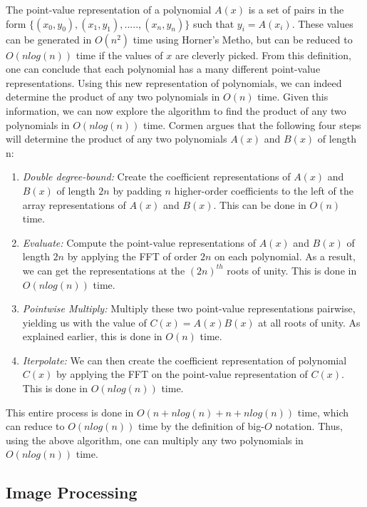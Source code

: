 \documentclass{amsproc}
\begin{document}
The point-value representation of a polynomial $A(x)$ is a set of pairs in the form ${\{(x_0, y_0), (x_1, y_1), ..... , (x_n, y_n)\}}$ such that $y_i = A(x_i)$.  These values can be generated in $O(n^2)$  time using Horner's Metho, but can be reduced to $O(nlog(n))$ time if the values of $x$ are cleverly picked. From this definition, one can conclude that each polynomial has a many different point-value representations. Using this new representation of polynomials, we can indeed determine the product of any two polynomials in $O(n)$ time. Given this information, we can now explore the algorithm to find the product of any two polynomials in $O(nlog(n))$ time. Cormen argues that the following four steps will determine the product of any two polynomials $A(x)$ and $B(x)$ of length n:

\begin{enumerate}
	\item \textit{Double degree-bound: } Create the coefficient representations of $A(x)$ and $B(x)$ of length $2n$ by padding $n$ higher-order coefficients to the left of the array representations of $A(x)$ and $B(x)$. This can be done in $O(n)$ time.
	\item \textit{Evaluate: } Compute the point-value representations of $A(x)$ and $B(x)$ of length $2n$ by applying the FFT of order $2n$ on each polynomial. As a result, we can get the representations at the $(2n)^{th}$ roots of unity. This is done in $O(nlog(n))$ time.
	\item \textit{Pointwise Multiply: } Multiply these two point-value representations pairwise, yielding us with the value of $C(x) = A(x)B(x)$ at all roots of unity. As explained earlier, this is done in $O(n)$ time.
	\item \textit{Iterpolate: } We can then create the coefficient representation of polynomial  $C(x)$ by applying the FFT on the point-value representation of $C(x)$. This is done in $O(nlog(n))$ time.

\end{enumerate}

This entire process is done in $O(n + nlog(n) + n + nlog(n))$ time, which can reduce to $O(nlog(n))$ time by the definition of big-$O$ notation. Thus, using the above algorithm, one can multiply any two polynomials in $O(nlog(n))$ time.

\subsection{Image Processing}
\end{document}
